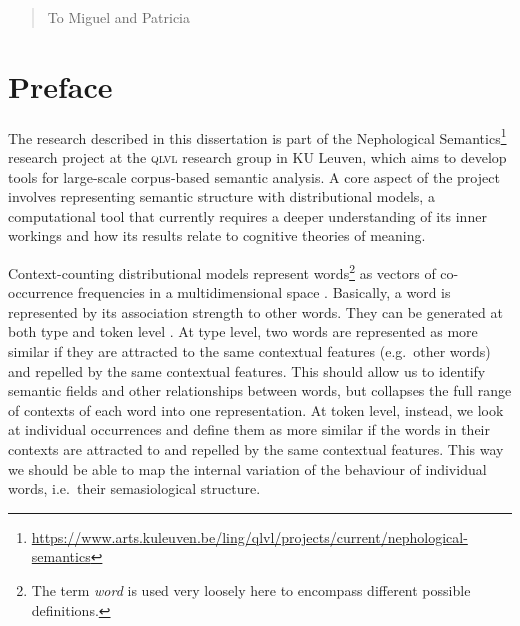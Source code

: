 \documentclass[
]{book}
\newenvironment{dedication}
    {\clearpage\vspace*{30ex}\begin{quotation}\begin{center}\begin{em}}
    {\par\end{em}\end{center}\end{quotation}\clearpage}
\begin{document}
\thispagestyle{empty}

\newpage
\thispagestyle{empty}
\mbox{}
\newpage

\thispagestyle{empty}
\begin{dedication}
To Miguel and Patricia
\end{dedication}

\newpage
\thispagestyle{empty}
\mbox{}
\newpage
\frontmatter

{
\setcounter{tocdepth}{1}
\tableofcontents
}
\listoftables
\listoffigures
\hypertarget{preface}{%
\chapter*{Preface}\label{preface}}

\fancyhead[LO,RE]{}
\fancyfoot[C]{}

The research described in this dissertation is part of the Nephological Semantics\footnote{\url{https://www.arts.kuleuven.be/ling/qlvl/projects/current/nephological-semantics}} research project at the \textsc{qlvl} research group in KU Leuven,
which aims to develop tools for large-scale corpus-based semantic analysis.
A core aspect of the project involves representing semantic structure with distributional models,
a computational tool that currently requires a deeper understanding of its inner workings
and how its results relate to cognitive theories of meaning.

Context-counting distributional models represent words\footnote{The term \emph{word} is used very loosely here to encompass different possible definitions.} as vectors of co-occurrence frequencies in a multidimensional space
\autocite{turney.pantel_2010,lenci_2018}. Basically, a word is represented by
its association strength to other words.
They can be generated at both type and token level \autocite{heylen.etal_2012,heylen.etal_2015,depascale_2019}.
At type level, two words are represented as more similar if they are attracted to the same
contextual features (e.g.~other words) and repelled by the same contextual features. This should
allow us to identify semantic fields and other relationships between words, but collapses the full
range of contexts of each word into one representation.
At token level, instead, we look at individual occurrences and define them as more similar if
the words in their contexts are attracted to and repelled by the same contextual features.
This way we should be able to map the internal variation of the behaviour of individual words,
i.e.~their semasiological structure.
\end{document}
